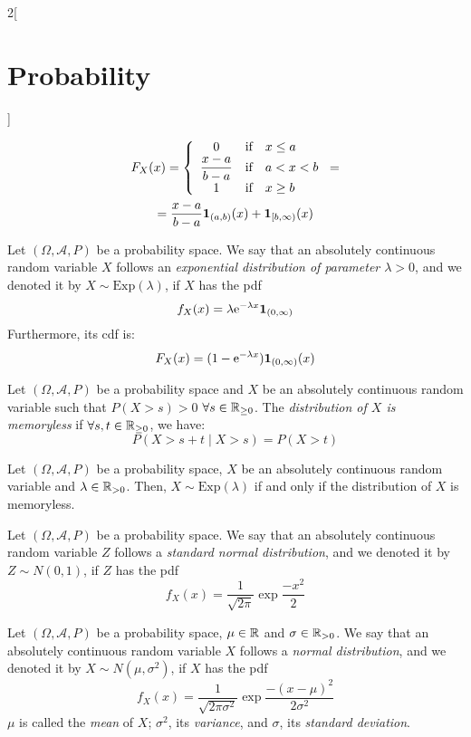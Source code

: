 \documentclass[../../../main.tex]{subfiles}
\begin{document}
\begin{multicols}{2}[\section{Probability}]
\begin{definition}
    \begin{multline*}
      F_X(x)=\left\{
      \begin{array}{ccl}
        0                            & \text{if} & x\leq a \\
        \displaystyle\frac{x-a}{b-a} & \text{if} & a<x<b   \\
        1                            & \text{if} & x\geq b \\
      \end{array}
      \right.=\\=\frac{x-a}{b-a}\boldsymbol{\mathrm{1}}_{(a,b)}(x)+\boldsymbol{\mathrm{1}}_{[b,\infty)}(x)
    \end{multline*}
  \end{definition}
  \begin{definition}
    Let $(\Omega,\mathcal{A},P)$ be a probability space. We say that an absolutely continuous random variable $X$ follows an \textit{exponential distribution of parameter $\lambda>0$}, and we denoted it by $X\sim \text{Exp}(\lambda)$, if $X$ has the pdf $$f_X(x)=\lambda\mathrm{e}^{-\lambda x}\boldsymbol{\mathrm{1}}_{(0,\infty)}$$ Furthermore, its cdf is:
    $$F_X(x)=(1-\mathrm{e}^{-\lambda x})\boldsymbol{\mathrm{1}}_{(0,\infty)}(x)$$
  \end{definition}
  \begin{definition}
    Let $(\Omega,\mathcal{A},P)$ be a probability space and $X$ be an absolutely continuous random variable such that $P(X >s)>0$ $\forall s\in\mathbb{R}_{\geq 0}$. The \textit{distribution of $X$ is memoryless} if $\forall s,t\in\mathbb{R}_{\geq 0}$, we have: $$P(X>s+t\mid X >s)=P(X>t)$$
  \end{definition}
  \begin{prop}
    Let $(\Omega,\mathcal{A},P)$ be a probability space, $X$ be an absolutely continuous random variable and $\lambda\in\mathbb{R}_{>0}$. Then, $X\sim\text{Exp}(\lambda)$ if and only if the distribution of $X$ is memoryless.
  \end{prop}
  \begin{definition}
    Let $(\Omega,\mathcal{A},P)$ be a probability space. We say that an absolutely continuous random variable $Z$ follows a \textit{standard normal distribution}, and we denoted it by $Z\sim N(0,1)$, if $Z$ has the pdf $$f_X(x)=\frac{1}{\sqrt{2\pi}}\exp{\frac{-x^2}{2}}$$
  \end{definition}
  \begin{definition}
    Let $(\Omega,\mathcal{A},P)$ be a probability space, $\mu\in\mathbb{R}$ and $\sigma\in\mathbb{R}_{>0}$. We say that an absolutely continuous random variable $X$ follows a \textit{normal distribution}, and we denoted it by $X\sim N(\mu,\sigma^2)$, if $X$ has the pdf $$f_X(x)=\frac{1}{\sqrt{2\pi\sigma^2}}\exp{\frac{-{(x-\mu)}^2}{2\sigma^2}}$$ $\mu$ is called the \textit{mean} of $X$; $\sigma^2$, its \textit{variance}, and $\sigma$, its \textit{standard deviation}.

\end{definition}
\end{multicols}
\end{document}
